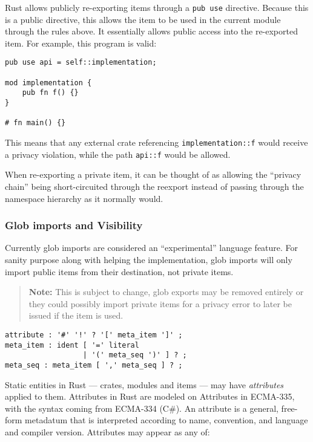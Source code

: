 \documentclass[]{article}
\begin{document}
Rust allows publicly re-exporting items through a \texttt{pub use}
directive. Because this is a public directive, this allows the item to
be used in the current module through the rules above. It essentially
allows public access into the re-exported item. For example, this
program is valid:

\begin{verbatim}
pub use api = self::implementation;

mod implementation {
    pub fn f() {}
}

# fn main() {}
\end{verbatim}

This means that any external crate referencing
\texttt{implementation::f} would receive a privacy violation, while the
path \texttt{api::f} would be allowed.

When re-exporting a private item, it can be thought of as allowing the
``privacy chain'' being short-circuited through the reexport instead of
passing through the namespace hierarchy as it normally would.

\subsubsection{Glob imports and
Visibility}\label{glob-imports-and-visibility}

Currently glob imports are considered an ``experimental'' language
feature. For sanity purpose along with helping the implementation, glob
imports will only import public items from their destination, not
private items.

\begin{quote}
\textbf{Note:} This is subject to change, glob exports may be removed
entirely or they could possibly import private items for a privacy error
to later be issued if the item is used.
\end{quote}


\begin{verbatim}
attribute : '#' '!' ? '[' meta_item ']' ;
meta_item : ident [ '=' literal
                  | '(' meta_seq ')' ] ? ;
meta_seq : meta_item [ ',' meta_seq ] ? ;
\end{verbatim}

Static entities in Rust --- crates, modules and items --- may have
\emph{attributes} applied to them. Attributes in Rust are modeled on
Attributes in ECMA-335, with the syntax coming from ECMA-334 (C\#). An
attribute is a general, free-form metadatum that is interpreted
according to name, convention, and language and compiler version.
Attributes may appear as any of:
\end{document}
